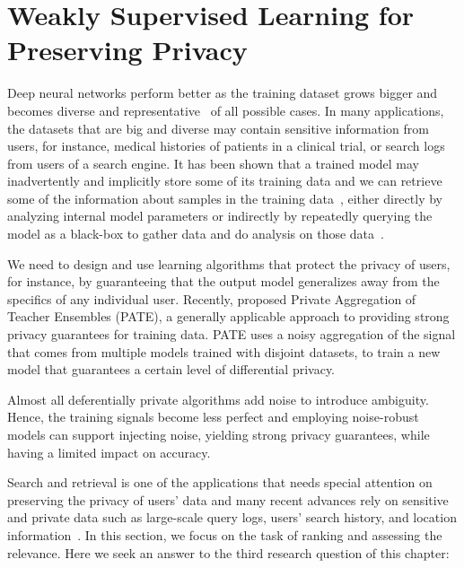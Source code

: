 \section{Weakly Supervised Learning for Preserving Privacy}
Deep neural networks perform better as the training dataset grows bigger and becomes diverse and representative~\citep{sun2017revisiting} of all possible cases.  In many applications, the datasets that are big and diverse may contain sensitive information from users, for instance, medical histories of patients in a clinical trial, or search logs from users of a search engine.  
It has been shown that a trained model may inadvertently
and implicitly store some of its training data and we can retrieve some of the information about samples in the training data~\citep{Shokri:2015}, either directly by analyzing internal model parameters or indirectly by repeatedly querying the model as a black-box to gather data and do analysis on those data~\citep{Fredrikson:2015}. 

We need to design and use learning algorithms that protect the privacy of users, for instance, by guaranteeing that the output model generalizes away from the specifics of any
individual user. Recently, \citet{Papernot:2017} proposed Private Aggregation of Teacher Ensembles (PATE), a generally applicable approach to providing strong privacy guarantees for training data.  PATE uses a noisy aggregation of the signal that comes from multiple models trained with disjoint datasets, to train a new model that guarantees a certain level of differential privacy.

Almost all deferentially private algorithms add noise to introduce ambiguity. Hence, the training signals become less perfect and employing noise-robust models can support injecting noise, yielding strong privacy guarantees, while having a limited impact on accuracy.

Search and retrieval is one of the applications that needs special attention on preserving the privacy of users' data and many recent advances rely on sensitive and private data such as large-scale query logs, users’ search history, and location information~\citep{Yang:2017}. In this section, we focus on the task of ranking and assessing the relevance.
Here we seek an answer to the third research question of this chapter:

